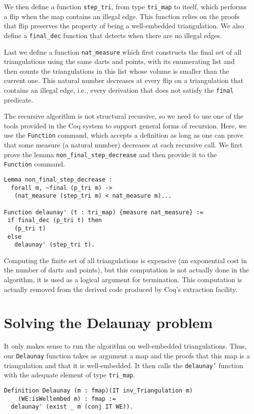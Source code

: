 \documentclass{llncs}
\begin{document}
We then define a function {\tt step\_tri}, from type {\tt tri\_map} to itself,
which performs a flip when the map contains an illegal edge.  This
function relies on the proofs that 
flip preserves the property of being a well-embedded triangulation.
We also define a {\tt final\_dec} function that detects when
 there are no illegal edges.

Last we define a function {\tt nat\_measure} which first constructs 
the final set of all triangulations using
the same darts and points, with its enumerating list and then counts the
triangulations in this list whose volume is smaller than the current one.
This natural number decreases at every flip on a triangulation
that contains an illegal edge, i.e., every derivation that does not 
satisfy the {\tt final} predicate.

The recursive algorithm is not structural recursive, so we need to use
one of the tools provided in the Coq system to support general forms
of recursion.  Here, we use the {\tt Function} command, which accepts a
definition as long as one can prove that some measure (a natural
number) decreases at each recursive call.  We first prove the lemma
{\tt non\_final\_step\_decrease} and then provide it to the {\tt
  Function} command.
\begin{verbatim}
Lemma non_final_step_decrease :
  forall m, ~final (p_tri m) ->
   (nat_measure (step_tri m) < nat_measure m)...

Function delaunay' (t : tri_map) {measure nat_measure} :=
 if final_dec (p_tri t) then
   (p_tri t)
 else
   delaunay' (step_tri t).
\end{verbatim}
Computing the finite set of all triangulations is expensive (an
exponential cost in the number of darts and points), but this
computation is not actually done in the algorithm, it is used as a
logical argument for termination.  This computation is actually
removed from the derived code produced by Coq's extraction facility.
\section{Solving the Delaunay problem} 
\label{DS}
It only makes sense to run the algorithm on well-embedded triangulations.
Thus, our {\tt Delaunay} function takes as argument a map and the proofs
that this map is a triangulation and that it is well-embedded.  It then calls
the {\tt delaunay'} function with the adequate element of type {\tt tri\_map}.
\begin{verbatim}
Definition Delaunay (m : fmap)(IT inv_Triangulation m)
    (WE:isWellembed m) : fmap :=
  delaunay' (exist _ m (conj IT WE)).
\end{verbatim}
\end{document}
